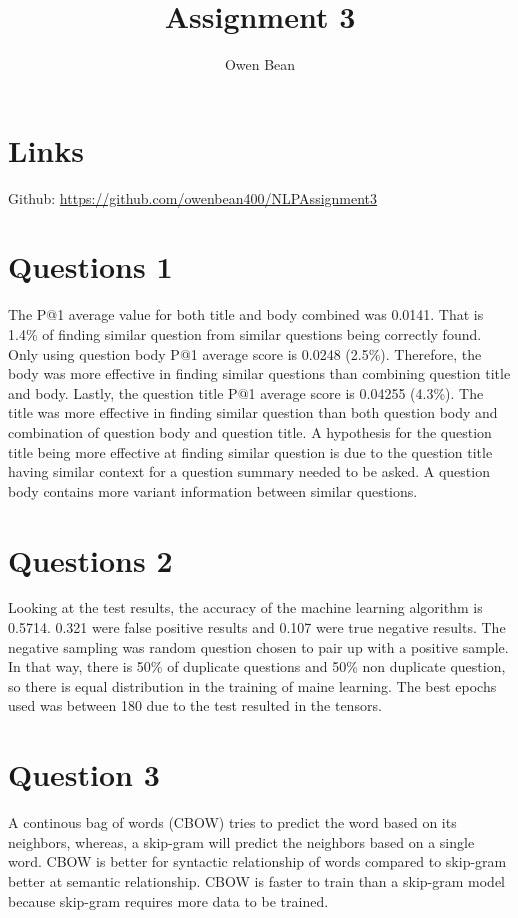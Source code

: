 \documentclass{article}
\title{Assignment 3}
\author{Owen Bean}
\begin{document}
\maketitle


\section{Links}

Github: \href{https://github.com/owenbean400/NLPAssignment3}{https://github.com/owenbean400/NLPAssignment3}

\section{Questions 1}

The P@1 average value for both title and body combined was 0.0141. That is 1.4\% of finding similar question from similar questions being correctly found. Only using question body P@1 average score is 0.0248 (2.5\%). Therefore, the body was more effective in finding similar questions than combining question title and body. Lastly, the question title P@1 average score is 0.04255 (4.3\%). The title was more effective in finding similar question than both question body and combination of question body and question title. A hypothesis for the question title being more effective at finding similar question is due to the question title having similar context for a question summary needed to be asked. A question body contains more variant information between similar questions.

\section{Questions 2}

Looking at the test results, the accuracy of the machine learning algorithm is 0.5714. 0.321 were false positive results and 0.107 were true negative results. The negative sampling was random question chosen to pair up with a positive sample. In that way, there is 50\% of duplicate questions and 50\% non duplicate question, so there is equal distribution in the training of maine learning. The best epochs used was between 180 due to the test resulted in the tensors.

\section{Question 3}

A continous bag of words (CBOW) tries to predict the word based on its neighbors, whereas, a skip-gram will predict the neighbors based on a single word. CBOW is better for syntactic relationship of words compared to skip-gram better at semantic relationship. CBOW is faster to train than a skip-gram model because skip-gram requires more data to be trained.
\end{document}
